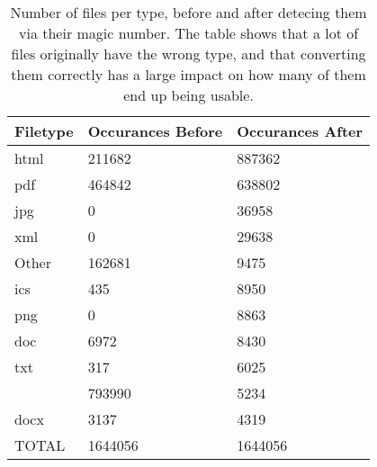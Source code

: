 \begin{table}[ht]
\centering
\begin{tabular}{lll}
  \hline
Filetype & Occurances Before & Occurances After \\ 
  \hline
html & 211682 & 887362 \\ 
  pdf & 464842 & 638802 \\ 
  jpg & 0 & 36958 \\ 
  xml & 0 & 29638 \\ 
  Other & 162681 & 9475 \\ 
  ics & 435 & 8950 \\ 
  png & 0 & 8863 \\ 
  doc & 6972 & 8430 \\ 
  txt & 317 & 6025 \\ 
   & 793990 & 5234 \\ 
  docx & 3137 & 4319 \\ 
  TOTAL & 1644056 & 1644056 \\ 
   \hline
\end{tabular}
\caption{Number of files per type, before and after detecing them via their magic number. The table shows that a lot of files originally have the wrong type, and that converting them correctly has a large impact on how many of them end up being usable.}
\label{tab:filetypes} 
\end{table}

